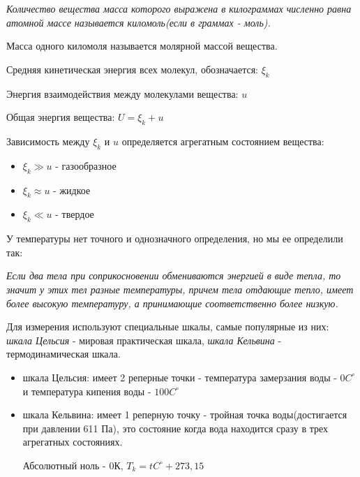  \textit{Количество вещества масса которого выражена в килограммах численно равна атомной массе называется киломоль(если в граммах - моль).}

 Масса одного киломоля называется молярной массой вещества.

\vspace{5px}

Средняя кинетическая энергия всех молекул, обозначается: $\xi_k$

\vspace{5px}

Энергия взаимодействия между молекулами вещества: $u$

\vspace{5px}

Общая энергия вещества: $U = \xi_k + u$

\newpage

Зависимость между $\xi_k$ и $u$ определяется агрегатным состоянием вещества:
\begin{itemize}
    \item $\xi_k \gg u$ - газообразное
    \item $\xi_k \approx u$ - жидкое
    \item $\xi_k \ll u$ - твердое
\end{itemize}
У температуры нет точного и однозначного определения, но мы ее определили так:

\vspace{5px}

 \textit{ Если два тела при соприкосновении обмениваются энергией в виде тепла, то значит у этих тел разные температуры, причем тела отдающие тепло, имеет более высокую температуру, а принимающие соответственно более низкую.}

\vspace{5px}

Для измерения используют специальные шкалы, самые популярные из них: \textit{шкала Цельсия}  - мировая практическая шкала, \textit{шкала Кельвина} - термодинамическая шкала.
\begin{itemize}
    \item шкала Цельсия: имеет 2 реперные точки - температура замерзания воды - $0 C^{\circ}$ и температура кипения воды - $100 C^{\circ}$
    \item шкала Кельвина: имеет 1 реперную точку - тройная точка воды(достигается при давлении 611 Па), это состояние когда вода находится сразу в трех агрегатных состояниях.

          Абсолютный ноль - 0К, $T_k = tC^{\circ} + 273,15$
\end{itemize}

